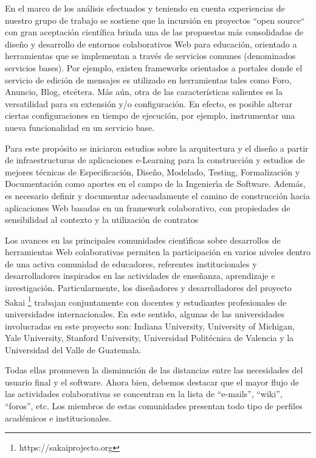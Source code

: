 En el marco de los análisis efectuados y teniendo en cuenta experiencias de nuestro grupo de trabajo se sostiene que la incursión en proyectos “open source“ con gran aceptación científica brinda una de las propuestas más consolidadas de diseño y desarrollo de entornos colaborativos Web para educación, orientado a herramientas que se implementan a través de servicios comunes (denominados servicios bases). Por ejemplo, existen frameworks orientados a portales
donde el servicio de edición de mensajes es utilizado en herramientas tales como Foro, Anuncio, Blog, etcétera. Más aún, otra de las características salientes es la versatilidad para su extensión y/o configuración. En efecto, es posible alterar ciertas configuraciones
en tiempo de ejecución, por ejemplo, instrumentar una nueva funcionalidad en un servicio base.

Para este propósito se iniciaron estudios sobre la arquitectura y el diseño a partir de infraestructuras de aplicaciones e-Learning para la construcción y estudios de mejores técnicas de Especificación, Diseño, Modelado, Testing, Formalización y Documentación como aportes en el campo de la Ingenierı́a de Software. Además, es necesario definir y documentar adecuadamente el camino de construcción hacia  aplicaciones Web basadas en un framework colaborativo, con propiedades de sensibilidad al contexto y la utilización de contratos \cite{arqDHD21}




Los avances en las principales comunidades cientı́ficas sobre desarrollos de herramientas Web colaborativas permiten la participación en varios niveles dentro de una activa comunidad de educadores, referentes institucionales y desarrolladores inspirados en las actividades de enseñanza, aprendizaje e investigación. Particularmente, los diseñadores y desarrolladores del proyecto Sakai \footnote{https://sakaiprojecto.org} trabajan conjuntamente con docentes y estudiantes profesionales de universidades internacionales. En este sentido, algunas de las universidades involucradas en este proyecto son: Indiana University, University of Michigan, Yale University, Stanford University, Universidad Politécnica de Valencia y la Universidad del Valle de Guatemala. 

Todas ellas promueven la disminución de las distancias entre las necesidades del usuario final y el software. Ahora bien, debemos destacar que el mayor flujo de las actividades colaborativas se concentran en la lista de “e-mails”, “wiki”, “foros”, etc. Los miembros de estas comunidades presentan todo tipo de perfiles académicos e institucionales.



